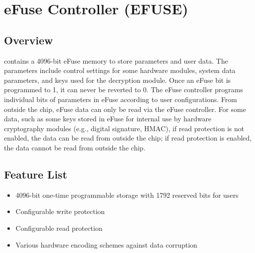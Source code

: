 \documentclass[main\_\_EN.tex]{subfiles}
\begin{document}

\ifglobal
\else
    \listoftodos
    {\let\clearpage\relax \listofdonetodos}
    \tableofcontents
\fi










\hypertarget{efuse}{}
\chapter{eFuse Controller (EFUSE)}
\label{mod:efuse}


\section{Overview}

\chipname{} contains a 4096-bit eFuse memory to store parameters and user data. The parameters include control settings for some hardware modules, system data parameters, and keys used for the decryption module. Once an eFuse bit is programmed to 1, it can never be reverted to 0. The eFuse controller programs individual bits of parameters in eFuse according to user configurations. From outside the chip, eFuse data can only be read via the eFuse controller. For some data, such as some keys stored in eFuse for internal use by hardware cryptography modules (e.g., digital signature, HMAC), if read protection is not enabled, the data can be read from outside the chip; if read protection is enabled, the data cannot be read from outside the chip.


\section{Feature List}

\begin{itemize}
    \item 4096-bit one-time programmable storage with 1792 reserved bits for users
    \item Configurable write protection
    \item Configurable read protection
    \item Various hardware encoding schemes against data corruption
\end{itemize}
\end{document}
